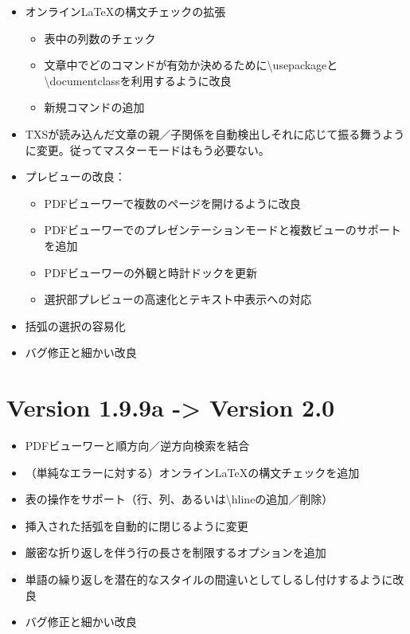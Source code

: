 \documentclass[]{book}
\begin{document}
\begin{itemize}
\item
  オンラインLaTeXの構文チェックの拡張

  \begin{itemize}
  \item
    表中の列数のチェック
  \item
    文章中でどのコマンドが有効か決めるために\textbackslash{}usepackageと\textbackslash{}documentclassを利用するように改良
  \item
    新規コマンドの追加
  \end{itemize}
\item
  TXSが読み込んだ文章の親／子関係を自動検出しそれに応じて振る舞うように変更。従ってマスターモードはもう必要ない。
\item
  プレビューの改良：

  \begin{itemize}
  \item
    PDFビューワーで複数のページを開けるように改良
  \item
    PDFビューワーでのプレゼンテーションモードと複数ビューのサポートを追加
  \item
    PDFビューワーの外観と時計ドックを更新
  \item
    選択部プレビューの高速化とテキスト中表示への対応
  \end{itemize}
\item
  括弧の選択の容易化
\item
  バグ修正と細かい改良
\end{itemize}

\section{Version 1.9.9a -\textgreater{} Version 2.0}

\begin{itemize}
\item
  PDFビューワーと順方向／逆方向検索を結合
\item
  （単純なエラーに対する）オンラインLaTeXの構文チェックを追加
\item
  表の操作をサポート（行、列、あるいは\textbackslash{}hlineの追加／削除）
\item
  挿入された括弧を自動的に閉じるように変更
\item
  厳密な折り返しを伴う行の長さを制限するオプションを追加
\item
  単語の繰り返しを潜在的なスタイルの間違いとしてしるし付けするように改良
\item
  バグ修正と細かい改良
\end{itemize}
\end{document}
